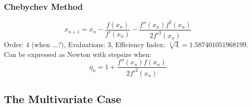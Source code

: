\subsubsection{Chebychev Method}
\begin{equation}
 x_{n+1} = x_n - \frac{f(x_n)}{f'(x_n)} - \frac{f''(x_n) f^2(x_n)}{2 f'^3(x_n)}
\end{equation}
Order: $4$ (when ...?), Evaluations: $3$, Efficiency Index: $\sqrt[3]{4} = 1.587401051968199$. Can be expressed as Newton with stepsize when:
\begin{equation}
 \eta_n = 1 + \frac{f''(x_n) f(x_n)} {2f'^2(x_n)} %
\end{equation}




\subsection{The Multivariate Case}

